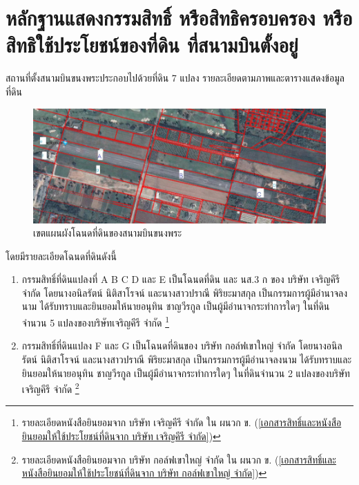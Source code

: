 \section{หลักฐานแสดงกรรมสิทธิ์ หรือสิทธิครอบครอง หรือสิทธิใช้ประโยชน์ของที่ดิน ที่สนามบินตั้งอยู่}

สถานที่ตั้งสนามบินขนงพระประกอบไปด้วยที่ดิน 7 แปลง รายละเอียดตามภาพและตารางแสดงข้อมูลที่ดิน

\begin{figure}[htbp]
\begin{center}
\includegraphics[width=\linewidth]{images/Picture7.png}
\caption{เขตแผนผังโฉนดที่ดินของสนามบินขนงพระ}
\label{default}
\end{center}
\end{figure}

โดยมีรายละเอียดโฉนดที่ดินดังนี้

\begin{enumerate}
\item กรรมสิทธิ์ที่ดินแปลงที่ A B C D และ E เป็นโฉนดที่ดิน และ นส.3 ก ของ บริษัท เจริญคีรี จำกัด โดยนางอนิลรัตน์ นิติสาโรจน์ และนางสาวปราณี พิริยะมาสกุล เป็นกรรมการผู้มีอำนาจลงนาม ได้รับทราบและยินยอมให้นายอนุทิน ชาญวีรกูล เป็นผู้มีอำนาจกระทำการใดๆ ในที่ดินจำนวน 5 แปลงของบริษัทเจริญคีรี จำกัด \footnote{รายละเอียดหนังสือยินยอมจาก บริษัท เจริญคีรี จำกัด ใน ผนวก ข. (\ref{เอกสารสิทธิ์และหนังสือยินยอมให้ใช้ประโยชน์ที่ดินจาก บริษัท เจริญคีรี จำกัด})}
\item กรรมสิทธิ์ที่ดินแปลง F และ G เป็นโฉนดที่ดินของ บริษัท กอล์ฟเขาใหญ่ จำกัด โดยนางอนิลรัตน์ นิติสาโรจน์ และนางสาวปราณี พิริยะมาสกุล เป็นกรรมการผู้มีอำนาจลงนาม ได้รับทราบและยินยอมให้นายอนุทิน ชาญวีรกูล เป็นผู้มีอำนาจกระทำการใดๆ ในที่ดินจำนวน 2 แปลงของบริษัทเจริญคีรี จำกัด \footnote{รายละเอียดหนังสือยินยอมจาก บริษัท กอล์ฟเขาใหญ่ จำกัด ใน ผนวก ข. (\ref{เอกสารสิทธิ์และหนังสือยินยอมให้ใช้ประโยชน์ที่ดินจาก บริษัท กอล์ฟเขาใหญ่ จำกัด})}
\end{enumerate}

